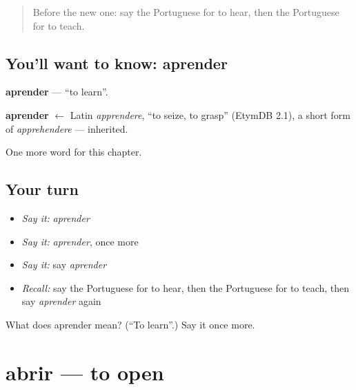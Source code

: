 \label{lesson:PT-C42-aprender}



\begin{quote}
Before the new one: say the Portuguese for to hear, then the Portuguese for to teach.
\end{quote}

\subsection*{You'll want to know: aprender}
\textbf{aprender} — \textquotedblleft{}to learn\textquotedblright{}.

\begin{cousinweb}
\textbf{aprender} $\leftarrow$ Latin \emph{apprendere}, \textquotedblleft{}to seize, to grasp\textquotedblright{} (EtymDB 2.1), a short form of \emph{apprehendere} — inherited.
\end{cousinweb}

\begin{grammarlens}[title={What you've built}]
One more word for this chapter.
\end{grammarlens}

\subsection*{Your turn}
\begin{itemize}
\raggedright
  \item \emph{Say it:} \emph{aprender}
  \item \emph{Say it:} \emph{aprender}, once more
  \item \emph{Say it:} say \emph{aprender}
  \item \emph{Recall:} say the Portuguese for to hear, then the Portuguese for to teach, then say \emph{aprender} again
\end{itemize}

\begin{tcolorbox}[breakable,colback=teal!4,colframe=teal!35!black,title={Before you move on}]
What does aprender mean? (\textquotedblleft{}To learn\textquotedblright{}.) Say it once more.
\end{tcolorbox}
\section[abrir]{abrir — to open}

\label{lesson:PT-C42-abrir}



